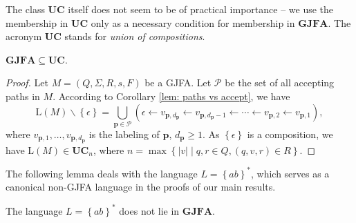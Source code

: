 \documentclass{ws-ijmpc}
\begin{document}
The class\textbf{ $\mathbf{UC}$ }itself does not seem to be of practical
importance -- we use the membership in $\mathbf{UC}$ only as a necessary
condition for membership in $\mathbf{GJFA}$. The acronym \textbf{UC}
stands for \emph{union of compositions}\@.
\begin{lemma}
\label{Lem:neces zob}$\mathbf{GJFA}\subseteq\mathbf{UC}$.\end{lemma}
\begin{proof}
Let $M=\left(Q,\Sigma,R,s,F\right)$ be a GJFA. Let $\mathcal{P}$
be the set of all accepting paths in $M$. According to Corollary
\ref{lem: paths vs accept}, we have 
\[
\mathrm{L}\!\left(M\right)\backslash\left\{ \epsilon\right\} =\bigcup_{\mathbf{p}\in\mathcal{P}}\left(\epsilon\leftarrow v_{\mathbf{p},d_{\mathbf{p}}}\leftarrow v_{\mathbf{p},d_{\mathbf{p}}-1}\leftarrow\cdots\leftarrow v_{\mathbf{p},2}\leftarrow v_{\mathbf{p},1}\right),
\]
where $v_{\mathbf{p},1},\dots,v_{\mathbf{p},d_{\mathbf{p}}}$ is the
labeling of $\mathbf{p}$, $d_{\mathbf{p}}\ge1$. As $\left\{ \epsilon\right\} $
is a composition, we have $\mathrm{L}\!\left(M\right)\in\mathbf{UC}_{n}$,
where $n=\max\left\{ \left|v\right|\mid q,r\in Q,\left(q,v,r\right)\in R\right\} $.
\end{proof}
The following lemma deals with the language $L=\left\{ ab\right\} ^{*}$,
which serves as a canonical non-GJFA language in the proofs of our
main results.
\begin{lemma}
\label{lem:gjfa ab star}The language $L=\left\{ ab\right\} ^{*}$
does not lie in $\mathrm{\mathbf{GJFA}}$.\end{lemma}
\end{document}

